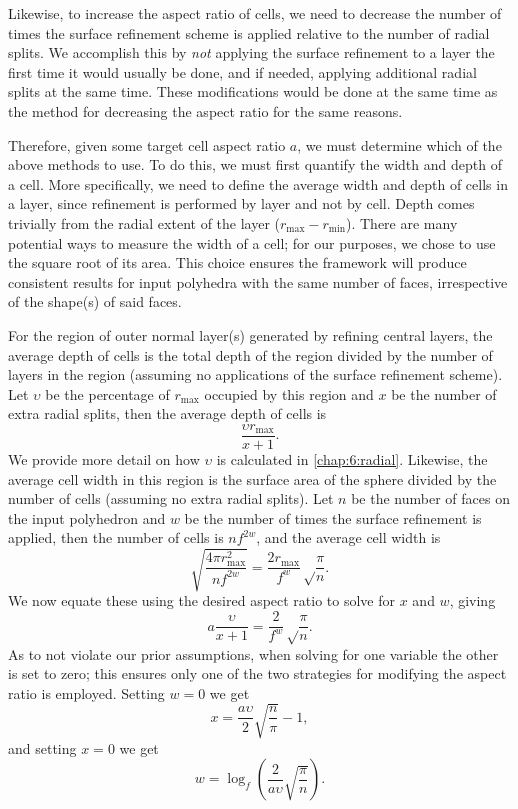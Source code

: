 Likewise, to increase the aspect ratio of cells, we need to decrease the number of times the surface refinement scheme is applied relative to the number of radial splits.
We accomplish this by \textit{not} applying the surface refinement to a layer the first time it would usually be done, and if needed, applying additional radial splits at the same time.
These modifications would be done at the same time as the method for decreasing the aspect ratio for the same reasons.


Therefore, given some target cell aspect ratio $a$, we must determine which of the above methods to use.
To do this, we must first quantify the width and depth of a cell.
More specifically, we need to define the average width and depth of cells in a layer, since refinement is performed by layer and not by cell.
Depth comes trivially from the radial extent of the layer ($r_\mathrm{max} - r_\mathrm{min}$).
There are many potential ways to measure the width of a cell; for our purposes, we chose to use the square root of its area.
This choice ensures the framework will produce consistent results for input polyhedra with the same number of faces, irrespective of the shape(s) of said faces.


For the region of outer normal layer(s) generated by refining central layers, the average depth of cells is the total depth of the region divided by the number of layers in the region (assuming no applications of the surface refinement scheme).
Let $\upsilon$ be the percentage of $r_\mathrm{max}$ occupied by this region and $x$ be the number of extra radial splits, then the average depth of cells is
%
\begin{equation*}
\frac{\upsilon r_\mathrm{max}}{x+1}.
\end{equation*}
%
We provide more detail on how $\upsilon$ is calculated in \cref{chap:6:radial}.
Likewise, the average cell width in this region is the surface area of the sphere divided by the number of cells (assuming no extra radial splits).
Let $n$ be the number of faces on the input polyhedron and $w$ be the number of times the surface refinement is applied, then the number of cells is $n f^{2w}$, and the average cell width is
%
\begin{equation*}
\sqrt{ \frac{ 4 \pi r_\mathrm{max}^2 }{ n f^{2 w} } } = \frac{2 r_\mathrm{max}}{f^w} \sqrt\frac{\pi}{n}.
\end{equation*}
%
We now equate these using the desired aspect ratio to solve for $x$ and $w$, giving
%
\begin{equation*}
a \frac{\upsilon}{x+1} = \frac{2}{f^w} \sqrt\frac{\pi}{n}.
\end{equation*}
%
As to not violate our prior assumptions, when solving for one variable the other is set to zero; this ensures only one of the two strategies for modifying the aspect ratio is employed.
Setting $w = 0$ we get
%
\begin{equation} \label{eq:extraSplits}
x = \frac{a \upsilon}{2} \sqrt{\frac{n}{\pi}} - 1,
\end{equation}
%
and setting $x = 0$ we get
%
\begin{equation} \label{eq:extraSurface}
w = \log_{f} \left( \frac{2}{a \upsilon} \sqrt{ \frac{\pi}{n}} \right).
\end{equation}


